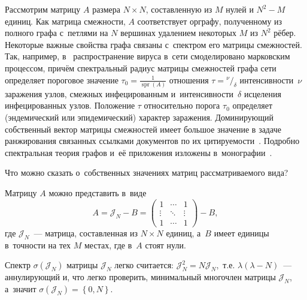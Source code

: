 Рассмотрим матрицу \( A \) размера \( N\times N \),
 составленную из \( M \) нулей и \( N^2 - M \) единиц.
Как матрица смежности, \( A \) соответствует орграфу,
 полученному из полного графа с~петлями на \( N \) вершинах
 удалением некоторых \( M \) из \( N^2 \) р\"ебер.
Некоторые важные свойства графа связаны с~спектром его матрицы смежностей.
Так, например, в~\cite{wang2003epidemic,chakrabarti2008epidemic}
 распространение вируса в~сети смоделировано марковским процессом,
 причём спектральный радиус матрицы смежностей графа сети
 определяет пороговое значение
 \( \tau_0=\frac{1}{\operatorname{spr}(A)} \)
 отношения \( \tau = {^\nu/_\delta} \)
 интенсивности~\( \nu \) заражения узлов, смежных инфецированным
 и~интенсивности~\( \delta \) исцеления инфецированных узлов.
 Положение \(\tau\) относительно порога \({\tau_0}\) определяет
 (эндемический или эпидемический) характер заражения.
Доминирующий собственный вектор матрицы смежностей
имеет большое значение в задаче
ранжирования связанных ссылками документов
по их цитируемости~\cite{bonacich1972factoring,ilprints422}.
Подробно спектральная теория графов и~е\"е приложения
изложены в~монографии~\cite{cvetkovic1980spectra}.

Что можно сказать о~собственных значениях матриц рассматриваемого вида?

Матрицу \( A \) можно представить в~виде
\[ A = \mathcal{J}_N - B =
    \begin{pmatrix}1 & \cdots & 1\\ \vdots & \ddots & \vdots \\ 1 & \cdots & 1\end{pmatrix} - B, \]
 где \( \mathcal{J}_N \)~--- матрица, составленная из \( N\times N \) единиц,
 а~\( B \) имеет единицы в~точности на тех \( M \) местах,
 где в~\( A \) стоят нули.

Спектр \( \sigma\left( \mathcal{J}_N \right) \)
 матрицы \( \mathcal{J}_N \) легко считается:
 \( \mathcal{J}_N^2 = N \mathcal{J}_N, \) т.е.
 \( \lambda(\lambda - N) \)~--- аннулирующий и, что легко проверить,
 минимальный многочлен матрицы \( \mathcal{J}_N \), а~значит
 \( \sigma\left( \mathcal{J}_N \right) = \left\{ 0,N \right\}. \)

